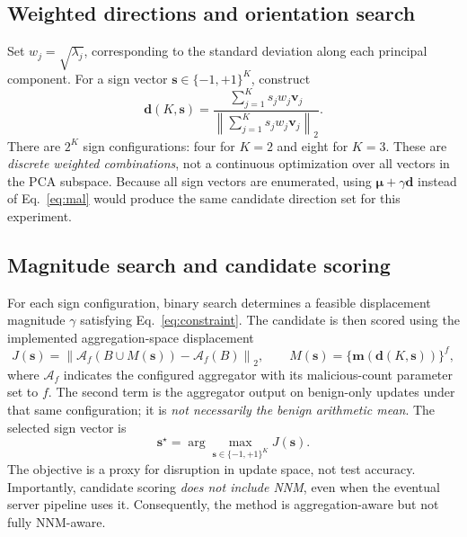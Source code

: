 \documentclass[11pt,a4paper]{article}
\newcommand{\norm}[1]{\left\lVert#1\right\rVert_2}
\newcommand{\mean}{\boldsymbol{\mu}}
\newcommand{\mal}{\boldsymbol{m}}
\newcommand{\dir}{\boldsymbol{d}}
\newcommand{\agg}{\mathcal{A}}
\begin{document}
\subsection{Weighted directions and orientation search}
Set $w_j=\sqrt{\lambda_j}$, corresponding to the standard deviation along each principal component. For a sign vector $\boldsymbol{s}\in\{-1,+1\}^K$, construct
\begin{equation}\label{eq:direction}
\dir(K,\boldsymbol{s})=\frac{\sum_{j=1}^{K}s_jw_j\boldsymbol{v}_j}{\norm{\sum_{j=1}^{K}s_jw_j\boldsymbol{v}_j}}.
\end{equation}
There are $2^K$ sign configurations: four for $K=2$ and eight for $K=3$. These are \emph{discrete weighted combinations}, not a continuous optimization over all vectors in the PCA subspace. Because all sign vectors are enumerated, using $\mean+\gamma\dir$ instead of Eq.~\eqref{eq:mal} would produce the same candidate direction set for this experiment.

\subsection{Magnitude search and candidate scoring}
For each sign configuration, binary search determines a feasible displacement magnitude $\gamma$ satisfying Eq.~\eqref{eq:constraint}. The candidate is then scored using the implemented aggregation-space displacement
\begin{equation}\label{eq:score}
J(\boldsymbol{s})=\norm{\agg_f(B\cup M(\boldsymbol{s}))-\agg_f(B)},
\qquad M(\boldsymbol{s})=\{\mal(\dir(K,\boldsymbol{s}))\}^{f},
\end{equation}
where $\agg_f$ indicates the configured aggregator with its malicious-count parameter set to $f$. The second term is the aggregator output on benign-only updates under that same configuration; it is \emph{not necessarily the benign arithmetic mean}. The selected sign vector is
\begin{equation}
\boldsymbol{s}^{\star}=\arg\max_{\boldsymbol{s}\in\{-1,+1\}^{K}}J(\boldsymbol{s}).
\end{equation}
The objective is a proxy for disruption in update space, not test accuracy. Importantly, candidate scoring \emph{does not include NNM}, even when the eventual server pipeline uses it. Consequently, the method is aggregation-aware but not fully NNM-aware.
\end{document}
